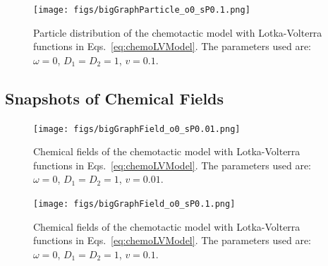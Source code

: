 \documentclass{article}
\begin{document}
\begin{figure}[H]
    \centering
    \texttt{[image: figs/bigGraphParticle\_o0\_sP0.1.png]}
    \caption{
        Particle distribution of the chemotactic model with Lotka-Volterra functions in Eqs.~\eqref{eq:chemoLVModel}. The parameters used are: $\omega=0$, $D_1=D_2=1$, $v=0.1$.
    }
\end{figure}

% 

\subsection{Snapshots of Chemical Fields}
\begin{figure}[H]
    \centering
    \texttt{[image: figs/bigGraphField\_o0\_sP0.01.png]}
    \caption{
        Chemical fields of the chemotactic model with Lotka-Volterra functions in Eqs.~\eqref{eq:chemoLVModel}. The parameters used are: $\omega=0$, $D_1=D_2=1$, $v=0.01$.
    }
\end{figure}

\begin{figure}[H]
    \centering
    \texttt{[image: figs/bigGraphField\_o0\_sP0.1.png]}
    \caption{
        Chemical fields of the chemotactic model with Lotka-Volterra functions in Eqs.~\eqref{eq:chemoLVModel}. The parameters used are: $\omega=0$, $D_1=D_2=1$, $v=0.1$.
    }
\end{figure}
\end{document}
